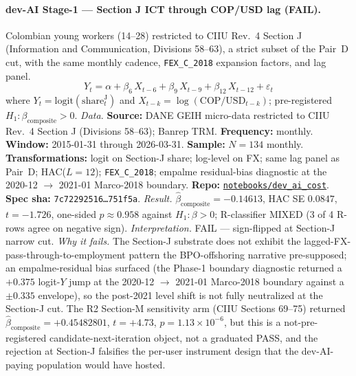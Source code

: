 \paragraph{dev-AI Stage-1 --- Section J ICT through COP/USD lag (FAIL).}
Colombian young workers (14--28) restricted to CIIU Rev.~4 Section J (Information and Communication, Divisions 58--63), a strict subset of the Pair~D cut, with the same monthly cadence, \texttt{FEX\_C\_2018} expansion factors, and lag panel.
\[ Y_t = \alpha + \beta_6\, X_{t-6} + \beta_9\, X_{t-9} + \beta_{12}\, X_{t-12} + \varepsilon_t \]
where \(Y_t = \mathrm{logit}(\mathrm{share}_t^{\mathrm{J}})\) and \(X_{t-k} = \log(\mathrm{COP}/\mathrm{USD}_{t-k})\); pre-registered \(H_1: \beta_{\mathrm{composite}} > 0\).
\textit{Data.} \textbf{Source:} DANE GEIH micro-data restricted to CIIU Rev.~4 Section J (Divisions 58--63); Banrep TRM. \textbf{Frequency:} monthly. \textbf{Window:} 2015-01-31 through 2026-03-31. \textbf{Sample:} \(N = 134\) monthly. \textbf{Transformations:} logit on Section-J share; log-level on FX; same lag panel as Pair~D; HAC(\(L=12\)); \texttt{FEX\_C\_2018}; empalme residual-bias diagnostic at the 2020-12 \(\to\) 2021-01 Marco-2018 boundary. \textbf{Repo:} \href{https://github.com/JMSBPP/abrigo-analytics/tree/master/notebooks/dev_ai_cost}{\texttt{notebooks/dev\_ai\_cost}}. \textbf{Spec sha:} \texttt{7c72292516\ldots 751f5a}.
\textit{Result.} \(\hat{\beta}_{\mathrm{composite}} = -0.14613\), HAC SE \(0.0847\), \(t = -1.726\), one-sided \(p \approx 0.958\) against \(H_1: \beta > 0\); R-classifier MIXED (3 of 4 R-rows agree on negative sign).
\textit{Interpretation.} FAIL --- sign-flipped at Section-J narrow cut.
\textit{Why it fails.} The Section-J substrate does not exhibit the lagged-FX-pass-through-to-employment pattern the BPO-offshoring narrative pre-supposed; an empalme-residual bias surfaced (the Phase-1 boundary diagnostic returned a \(+0.375\) logit-\(Y\) jump at the 2020-12 \(\to\) 2021-01 Marco-2018 boundary against a \(\pm 0.335\) envelope), so the post-2021 level shift is not fully neutralized at the Section-J cut. The R2 Section-M sensitivity arm (CIIU Sections 69--75) returned \(\hat{\beta}_{\mathrm{composite}} = +0.45482801\), \(t = +4.73\), \(p = 1.13 \times 10^{-6}\), but this is a not-pre-registered candidate-next-iteration object, not a graduated PASS, and the rejection at Section-J falsifies the per-user instrument design that the dev-AI-paying population would have hosted.

